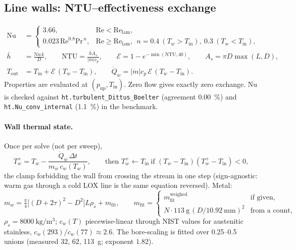 \documentclass[11pt,a4paper]{article}
\newcommand{\mdot}{\dot{m}}
\newcommand{\Qdot}{\dot{Q}}
\newcommand{\eff}{\mathcal{E}}          %
\newcommand{\code}[1]{\texttt{#1}}
\begin{document}
\subsection{Line walls: NTU--effectiveness exchange}\label{sec:wall}
\begin{align}
  \mathrm{Nu} &= \begin{cases}3.66, & \mathrm{Re}<\mathrm{Re}_{\mathrm{lam}},\\ 0.023\,\mathrm{Re}^{0.8}\mathrm{Pr}^{\,n}, & \mathrm{Re}\ge\mathrm{Re}_{\mathrm{lam}},\ \ n=0.4\ (T_w>T_{\mathrm{in}}),\ 0.3\ (T_w<T_{\mathrm{in}}),\end{cases}\\
  \bar h &= \frac{\mathrm{Nu}\,k}{D},\qquad
  \mathrm{NTU}=\frac{\bar h A_s}{|\mdot|c_p},\qquad
  \eff = 1-e^{-\min(\mathrm{NTU},40)},\qquad
  A_s = \pi D\max(L,D),\label{eq:ntu}\\
  T_{\mathrm{out}} &= T_{\mathrm{in}}+\eff\,(T_w-T_{\mathrm{in}}),\qquad
  \Qdot_w = |\mdot|c_p\,\eff\,(T_w-T_{\mathrm{in}}).
\end{align}
Properties are evaluated at $(p_{\mathrm{up}},T_{\mathrm{in}})$. Zero flow gives
exactly zero exchange. $\mathrm{Nu}$ is checked against
\code{ht.turbulent\_Dittus\_Boelter} (agreement \SI{0.00}{\percent}) and
\code{ht.Nu\_conv\_internal} (\SI{1.1}{\percent}) in the benchmark.

\paragraph{Wall thermal state.} Once per solve (not per sweep),
\begin{equation}
  T_w^{+} = T_w - \frac{\Qdot_w\,\Delta t}{m_w\,c_w(T_w)},\qquad
  \text{then } T_w^{+}\leftarrow T_{\mathrm{in}}\ \text{if } (T_w-T_{\mathrm{in}})(T_w^{+}-T_{\mathrm{in}})<0,
\end{equation}
the clamp forbidding the wall from crossing the stream in one step (sign-agnostic:
warm gas through a cold LOX line is the same equation reversed). Metal:
\begin{equation}
  m_w = \tfrac{\pi}{4}\bigl[(D+2\tau)^2-D^2\bigr]L\rho_s + m_{\mathrm{fit}},\qquad
  m_{\mathrm{fit}} = \begin{cases} m_{\mathrm{fit}}^{\mathrm{weighed}} & \text{if given},\\ N\cdot\SI{113}{\gram}\,(D/\SI{10.92}{\milli\metre})^2 & \text{from a count},\end{cases}
\end{equation}
$\rho_s=\SI{8000}{\kilogram\per\cubic\metre}$; $c_w(T)$ piecewise-linear through
NIST values for austenitic stainless, $c_w(293)/c_w(77)\approx2.6$. The
bore-scaling is fitted over \SIrange{0.25}{0.5}{\inch} unions (measured
$32$, $62$, \SI{113}{\gram}; exponent $1.82$).
\end{document}
